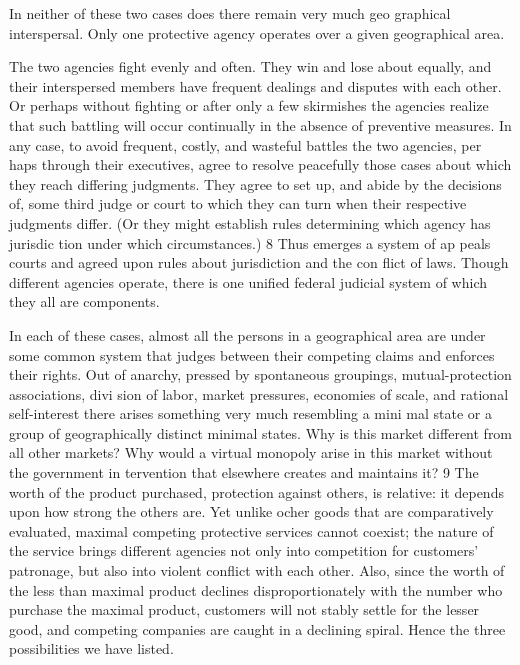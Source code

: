 \documentclass[11pt,openany]{book}
\begin{document}
In neither of these two cases does there remain very much geo graphical interspersal. Only one protective agency operates over a given geographical area. 

The two agencies fight evenly and often. They win and lose about equally, and their interspersed members have frequent dealings and disputes with each other. Or perhaps without fighting or after only a few skirmishes the agencies realize that such battling will occur continually in the absence of preventive measures. In any case, to avoid frequent, costly, and wasteful battles the two agencies, per haps through their executives, agree to resolve peacefully those cases about which they reach differing judgments. They agree to set up, and abide by the decisions of, some third judge or court to which they can turn when their respective judgments differ. (Or they might establish rules determining which agency has jurisdic tion under which circumstances.) 8 Thus emerges a system of ap peals courts and agreed upon rules about jurisdiction and the con flict of laws. Though different agencies operate, there is one unified federal judicial system of which they all are components. 

In each of these cases, almost all the persons in a geographical area are under some common system that judges between their competing claims and enforces their rights. Out of anarchy, pressed by spontaneous groupings, mutual-protection associations, divi sion of labor, market pressures, economies of scale, and rational self-interest there arises something very much resembling a mini mal state or a group of geographically distinct minimal states. Why is this market different from all other markets? Why would a virtual monopoly arise in this market without the government in tervention that elsewhere creates and maintains it? 9 The worth of the product purchased, protection against others, is relative: it depends upon how strong the others are. Yet unlike ocher goods that are comparatively evaluated, maximal competing protective services cannot coexist; the nature of the service brings different agencies not only into competition for customers' patronage, but also into violent conflict with each other. Also, since the worth of the less than maximal product declines disproportionately with the number who purchase the maximal product, customers will not stably settle for the lesser good, and competing companies are caught in a declining spiral. Hence the three possibilities we have listed. 
\end{document}
